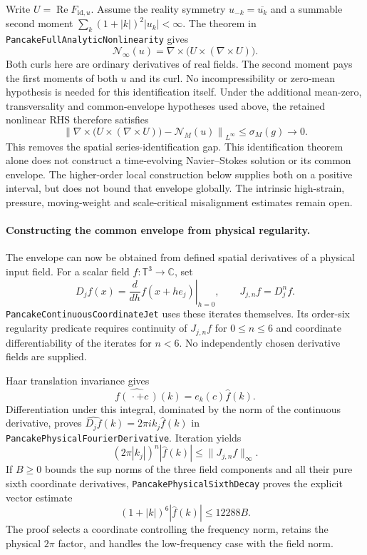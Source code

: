 \documentclass[11pt]{article}
\theoremstyle{definition}
\begin{document}
Write $U=\operatorname{Re}F_{\mathrm{id},u}$. Assume the reality symmetry
$u_{-k}=\overline{u_k}$ and a summable second moment
$\sum_k(1+|k|)^2|u_k|<\infty$.
The theorem in \texttt{PancakeFullAnalyticNonlinearity} gives
\[
 \boxed{\quad
 \mathcal N_\infty(u)
   =\nabla\times\bigl(U\times(\nabla\times U)\bigr).
 \quad}
\]
Both curls here are ordinary derivatives of real fields. The second
moment pays the first moments of both $u$ and its curl. No incompressibility
or zero-mean hypothesis is needed for this identification itself.
Under the additional mean-zero, transversality and common-envelope
hypotheses used above, the retained nonlinear RHS therefore satisfies
\[
 \left\|\nabla\times\bigl(U\times(\nabla\times U)\bigr)
            -\mathcal N_M(u)\right\|_{L^\infty}
       \le \sigma_M(g)\longrightarrow0.
\]
This removes the spatial series-identification gap. This identification
theorem alone does not construct a time-evolving Navier--Stokes solution or
its common envelope. The higher-order local construction below supplies
both on a positive interval, but does not bound that envelope globally. The
intrinsic high-strain, pressure, moving-weight and scale-critical
misalignment estimates remain open.

\paragraph{Constructing the common envelope from physical regularity.}
The envelope can now be obtained from defined spatial derivatives of a
physical input field. For a scalar field $f:\mathbb T^3\to\mathbb C$, set
\[
 D_jf(x)=\left.\frac{d}{dh}f(x+h e_j)\right|_{h=0},
 \qquad J_{j,n}f=D_j^n f.
\]
\texttt{PancakeContinuousCoordinateJet} uses these iterates themselves.
Its order-six regularity predicate requires continuity of $J_{j,n}f$
for $0\le n\le6$ and coordinate differentiability of the iterates for
$n<6$. No independently chosen derivative fields are supplied.

Haar translation invariance gives
\[
 \widehat{f(\,\cdot+c\,)}(k)=e_k(c)\widehat f(k).
\]
Differentiation under this integral, dominated by the norm of the
continuous derivative, proves
$\widehat{D_jf}(k)=2\pi i k_j\widehat f(k)$ in
\texttt{PancakePhysicalFourierDerivative}. Iteration yields
\[
 (2\pi|k_j|)^n|\widehat f(k)|
       \le \|J_{j,n}f\|_\infty .
\]
If $B\ge0$ bounds the sup norms of the three field components and all
their pure sixth coordinate derivatives,
\texttt{PancakePhysicalSixthDecay} proves the explicit vector estimate
\[
 (1+|k|)^6|\widehat f(k)|\le12288B .
\]
The proof selects a coordinate controlling the frequency norm, retains
the physical $2\pi$ factor, and handles the low-frequency case with the
field norm.
\end{document}
